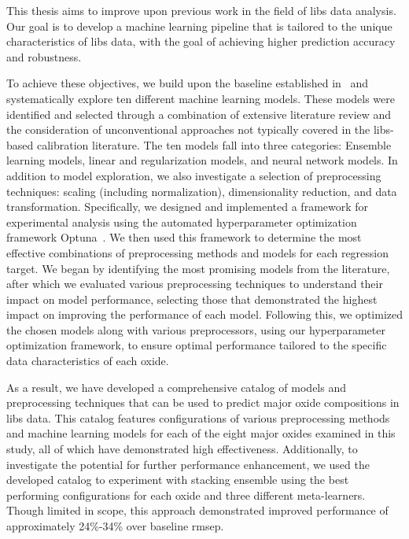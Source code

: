 This thesis aims to improve upon previous work in the field of \gls{libs} data analysis.
Our goal is to develop a machine learning pipeline that is tailored to the unique characteristics of \gls{libs} data, with the goal of achieving higher prediction accuracy and robustness.

To achieve these objectives, we build upon the baseline established in~\cite{p9_paper} and systematically explore ten different machine learning models.
These models were identified and selected through a combination of extensive literature review and the consideration of unconventional approaches not typically covered in the \gls{libs}-based calibration literature.
The ten models fall into three categories: Ensemble learning models, linear and regularization models, and neural network models.
In addition to model exploration, we also investigate a selection of preprocessing techniques: scaling (including normalization), dimensionality reduction, and data transformation.
Specifically, we designed and implemented a framework for experimental analysis using the automated hyperparameter optimization framework Optuna~\cite{optuna_2019}.
We then used this framework to determine the most effective combinations of preprocessing methods and models for each regression target.
We began by identifying the most promising models from the literature, after which we evaluated various preprocessing techniques to understand their impact on model performance, selecting those that demonstrated the highest impact on improving the performance of each model.
Following this, we optimized the chosen models along with various preprocessors, using our hyperparameter optimization framework, to ensure optimal performance tailored to the specific data characteristics of each oxide.

As a result, we have developed a comprehensive catalog of models and preprocessing techniques that can be used to predict major oxide compositions in \gls{libs} data.
This catalog features configurations of various preprocessing methods and machine learning models for each of the eight major oxides examined in this study, all of which have demonstrated high effectiveness.
Additionally, to investigate the potential for further performance enhancement, we used the developed catalog to experiment with stacking ensemble using the best performing configurations for each oxide and three different meta-learners.
Though limited in scope, this approach demonstrated improved performance of approximately 24\%-34\% over baseline \gls{rmsep}.

